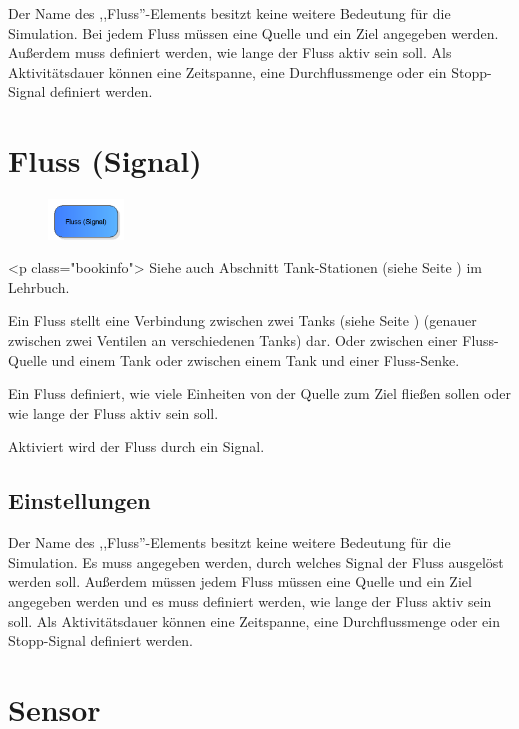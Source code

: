 Der Name des ,,Fluss''-Elements besitzt keine weitere Bedeutung für die Simulation.
Bei jedem Fluss müssen eine Quelle und ein Ziel angegeben werden.
Außerdem muss definiert werden, wie lange der Fluss aktiv sein soll. Als Aktivitätsdauer
können eine Zeitspanne, eine Durchflussmenge oder ein Stopp-Signal definiert werden.


\section{Fluss (Signal)}
\label{ref:ModelElementTankFlowBySignal}

\begin{figure}
\vspace{-22pt}
\includegraphics[width=2cm]{imageModelElementTankFlowBySignal.png}
\vspace{-22pt}
\end{figure}

<p class="bookinfo">
Siehe auch Abschnitt Tank-Stationen (siehe Seite \pageref{ref:book:8.8.2}) im Lehrbuch.

Ein Fluss stellt eine Verbindung zwischen zwei Tanks (siehe Seite \pageref{ref:ModelElementTank}) 
(genauer zwischen zwei Ventilen an verschiedenen Tanks) dar.
Oder zwischen einer Fluss-Quelle und einem Tank oder zwischen einem Tank und einer Fluss-Senke.

Ein Fluss definiert, wie viele Einheiten von der Quelle zum Ziel fließen sollen oder wie
lange der Fluss aktiv sein soll.

Aktiviert wird der Fluss durch ein Signal.

\subsection*{Einstellungen}

Der Name des ,,Fluss''-Elements besitzt keine weitere Bedeutung für die Simulation.
Es muss angegeben werden, durch welches Signal der Fluss ausgelöst werden soll.
Außerdem müssen jedem Fluss müssen eine Quelle und ein Ziel angegeben werden und es muss
definiert werden, wie lange der Fluss aktiv sein soll. Als Aktivitätsdauer
können eine Zeitspanne, eine Durchflussmenge oder ein Stopp-Signal definiert werden.


\section{Sensor}
\label{ref:ModelElementTankSensor}

